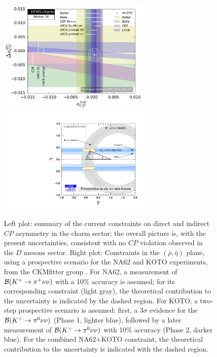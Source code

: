 \begin{figure}[!htb]
\begin{center}
\includegraphics[width=7.5cm]{./deltaACP_AGamma_fit_Winter16.pdf}
\includegraphics[width=7.5cm]{KbothPibothNuNu_RhoEta.pdf}
\end{center}
\caption{Left plot: summary of the current constraints on direct and indirect $CP$ asymmetry in the charm sector; the overall picture is, with the present uncertainties, consistent with no $CP$ violation observed in the $D$ mesons sector. Right plot: Constraints in the $(\bar{\rho}, \bar{\eta})$ plane, using a prospective scenario for the NA62 and KOTO experiments, from the CKMfitter group . For NA62, a measurement of $\mathcal B(K^{+}\rightarrow\pi ^{+}\nu\nu)$ with a 10\% accuracy is assumed; for its corresponding constraint (light gray), the theoretical contribution to the uncertainty is indicated by the dashed region. For KOTO, a two-step prospective scenario is assumed: first, a 3$\sigma$ evidence for the $\mathcal B(K^{+}\rightarrow\pi ^{0}\nu\nu)$ (Phase 1, lighter blue), followed by a later measurement of $\mathcal B(K^{+}\rightarrow\pi ^{0}\nu\nu)$  with 10\% accuracy (Phase 2, darker blue). For the combined NA62+KOTO constraint, the theoretical contribution to the uncertainty is indicated with the dashed region.}%
\label{fig charm}%
\end{figure}




%
%

%
